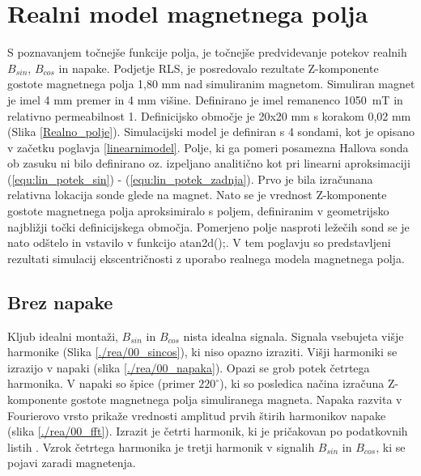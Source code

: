 \chapter{Realni model magnetnega polja}
S poznavanjem točnejše funkcije polja, je točnejše predvidevanje potekov realnih $B_{sin}$, $B_{cos}$ in napake. Podjetje RLS,  je posredovalo rezultate Z-komponente gostote magnetnega polja 1,80 mm nad simuliranim magnetom. Simuliran magnet je imel 4 mm premer in 4 mm višine. Definirano je imel remanenco 1050~mT in relativno permeabilnost 1.  Definicijsko območje  je 20x20 mm s korakom 0,02 mm (Slika \ref{Realno_polje}).
Simulacijski model je definiran s 4 sondami, kot je opisano v začetku poglavja \ref{linearnimodel}.
Polje, ki ga pomeri posamezna Hallova sonda ob zasuku ni bilo definirano oz. izpeljano analitično kot pri linearni aproksimaciji (\ref{equ:lin_potek_sin}) - (\ref{equ:lin_potek_zadnja}).  Prvo je bila izračunana relativna lokacija sonde glede na magnet. Nato se je vrednost Z-komponente gostote magnetnega polja  aproksimiralo s poljem, definiranim v geometrijsko najbližji točki definicijskega območja.
Pomerjeno polje nasproti ležečih sond se je nato odštelo in vstavilo v funkcijo atan2d();.
V tem poglavju so predstavljeni rezultati simulacij ekscentričnosti z uporabo realnega modela magnetnega polja.
\section{Brez napake}
Kljub idealni montaži, $B_{sin}$ in $B_{cos}$ nista idealna signala.  Signala vsebujeta višje harmonike (Slika \ref{./rea/00_sincos}), ki niso opazno izraziti. Višji harmoniki se izrazijo v napaki (slika \ref{./rea/00_napaka}). Opazi se grob potek četrtega harmonika. V napaki so špice (primer $220^{\circ}$), ki so posledica načina izračuna Z-komponente gostote  magnetnega polja simuliranega magneta. Napaka razvita v Fourierovo vrsto prikaže vrednosti amplitud prvih štirih harmonikov napake (slika \ref{./rea/00_fft}). Izrazit je četrti harmonik, ki je pričakovan po podatkovnih listih \cite{AM8192}. Vzrok četrtega harmonika je tretji harmonik v signalih  $B_{sin}$ in $B_{cos}$, ki se pojavi zaradi magnetenja.
\newpage
